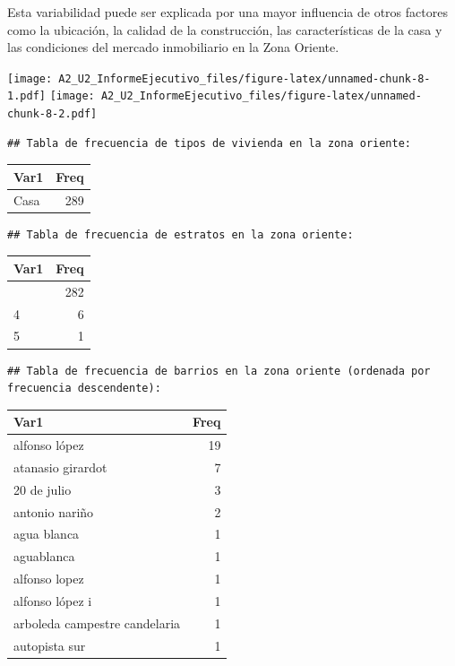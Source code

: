 \documentclass[
]{article}
\begin{document}
Esta variabilidad puede ser explicada por una mayor influencia de otros
factores como la ubicación, la calidad de la construcción, las
características de la casa y las condiciones del mercado inmobiliario en
la Zona Oriente.

\texttt{[image: A2\_U2\_InformeEjecutivo\_files/figure-latex/unnamed-chunk-8-1.pdf]}
\texttt{[image: A2\_U2\_InformeEjecutivo\_files/figure-latex/unnamed-chunk-8-2.pdf]}

\begin{verbatim}
## Tabla de frecuencia de tipos de vivienda en la zona oriente:
\end{verbatim}

\begin{longtable}[]{@{}lr@{}}
\toprule\noalign{}
Var1 & Freq \\
\midrule\noalign{}
\endhead
\bottomrule\noalign{}
\endlastfoot
Casa & 289 \\
\end{longtable}

\begin{verbatim}
## Tabla de frecuencia de estratos en la zona oriente:
\end{verbatim}

\begin{longtable}[]{@{}lr@{}}
\toprule\noalign{}
Var1 & Freq \\
\midrule\noalign{}
\endhead
\bottomrule\noalign{}
\endlastfoot
3 & 282 \\
4 & 6 \\
5 & 1 \\
\end{longtable}

\begin{verbatim}
## Tabla de frecuencia de barrios en la zona oriente (ordenada por frecuencia descendente):
\end{verbatim}

\begin{longtable}[]{@{}lr@{}}
\toprule\noalign{}
Var1 & Freq \\
\midrule\noalign{}
\endhead
\bottomrule\noalign{}
\endlastfoot
alfonso lópez & 19 \\
atanasio girardot & 7 \\
20 de julio & 3 \\
antonio nariño & 2 \\
agua blanca & 1 \\
aguablanca & 1 \\
alfonso lopez & 1 \\
alfonso lópez i & 1 \\
arboleda campestre candelaria & 1 \\
autopista sur & 1 \\
\end{longtable}
\end{document}
